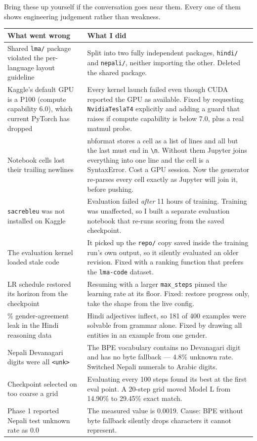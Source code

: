 \documentclass[11pt]{report}
\newcommand{\p}[1]{\texttt{#1}}
\begin{document}
Bring these up yourself if the conversation goes near them. Every one of them
shows engineering judgement rather than weakness.

\begin{center}
\begin{longtable}{@{}p{5.2cm}p{9.3cm}@{}}
\toprule
\textbf{What went wrong} & \textbf{What I did} \\
\midrule
\endhead
Shared \p{lma/} package violated the per-language layout guideline &
Split into two fully independent packages, \p{hindi/} and \p{nepali/}, neither
importing the other. Deleted the shared package. \\
\addlinespace
Kaggle's default GPU is a P100 (compute capability 6.0), which current PyTorch
has dropped &
Every kernel launch failed even though CUDA reported the GPU as available. Fixed
by requesting \p{NvidiaTeslaT4} explicitly and adding a guard that raises if
compute capability is below 7.0, plus a real matmul probe. \\
\addlinespace
Notebook cells lost their trailing newlines &
nbformat stores a cell as a list of lines and all but the last must end in
\p{\textbackslash n}. Without them Jupyter joins everything into one line and the
cell is a SyntaxError. Cost a GPU session. Now the generator re-parses every
cell exactly as Jupyter will join it, before pushing. \\
\addlinespace
\p{sacrebleu} was not installed on Kaggle &
Evaluation failed \emph{after} 11 hours of training. Training was unaffected, so
I built a separate evaluation notebook that re-runs scoring from the saved
checkpoint. \\
\addlinespace
The evaluation kernel loaded stale code &
It picked up the \p{repo/} copy saved inside the training run's own output, so it
silently evaluated an older revision. Fixed with a ranking function that prefers
the \p{lma-code} dataset. \\
\addlinespace
LR schedule restored its horizon from the checkpoint &
Resuming with a larger \p{max\_steps} pinned the learning rate at its floor.
Fixed: restore progress only, take the shape from the live config. \\
\addlinespace
45\% gender-agreement leak in the Hindi reasoning data &
Hindi adjectives inflect, so 181 of 400 examples were solvable from grammar
alone. Fixed by drawing all entities in an example from one gender. \\
\addlinespace
Nepali Devanagari digits were all \p{<unk>} &
The BPE vocabulary contains no Devanagari digit and has no byte fallback ---
4.8\% unknown rate. Switched Nepali numerals to Arabic digits. \\
\addlinespace
Checkpoint selected on too coarse a grid &
Evaluating every 100 steps found its best at the first eval point. A 20-step grid
moved Model L from 14.90\% to 29.45\% exact match. \\
\addlinespace
Phase 1 reported Nepali test unknown rate as 0.0 &
The measured value is 0.0019. Cause: BPE without byte fallback silently drops
characters it cannot represent. \\
\bottomrule
\end{longtable}
\end{center}
\end{document}

